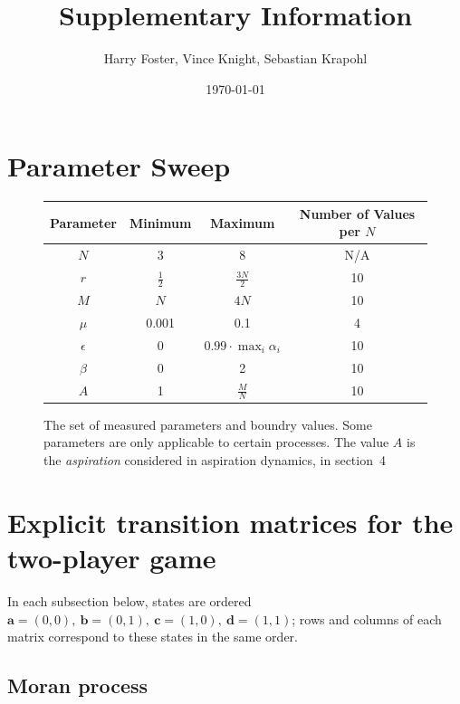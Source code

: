 \documentclass{article}
\title{Supplementary Information}
\author{Harry Foster, Vince Knight, Sebastian Krapohl}
\date{\today}
\begin{document}
\maketitle

\section{Parameter Sweep}
\begin{figure}[htbp]
    \centering
    \begin{tabular}{|c|c|c|c|}
        \hline
        Parameter & Minimum & Maximum & Number of Values per $N$\\
        \hline
        $N$ & 3 & 8 & N/A\\
        \hline
        $r$ & $\frac{1}{2}$ & $\frac{3N}{2}$ & 10\\
        \hline
        $M$ & $N$ & $4N$ & 10\\
        \hline
        $\mu$ & 0.001 & 0.1 & 4\\
        \hline
        $\epsilon$ & 0 & $0.99 \cdot \max_i \alpha_i$ &10\\
        \hline
        $\beta$ & 0 & 2 & 10\\
        \hline
        $A$ & 1 & \(\frac{M}{N}\) & 10\\
        \hline
    \end{tabular}
    \caption{The set of measured parameters and boundry values. Some parameters
    are only applicable to certain processes. The value $A$ is the
    \emph{aspiration} considered in aspiration dynamics, in section~4}
    \label{fig:parameter_sweep_table}
\end{figure}


\section{Explicit transition matrices for the two-player game}
\label{sec:explicit_matrices}

In each subsection below, states are ordered
\(\mathbf{a} = (0,0),\ \mathbf{b} = (0,1),\ \mathbf{c} = (1,0),\
\mathbf{d} = (1,1)\); rows and columns of each matrix correspond to these
states in the same order.

\subsection*{Moran process}
\end{document}
